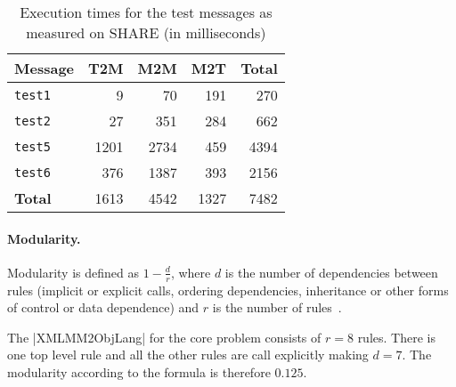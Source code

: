 \begin{table}[h!t]
  \centering
  \begin{tabular}{| l | r | r | r | r |}
    \hline
    \textbf{Message} & \textbf{T2M} & \textbf{M2M} & \textbf{M2T} & \textbf{Total} \\
    \hline
    \texttt{test1}   & 9      & 70     & 191   & 270  \\
    \texttt{test2}   & 27     & 351    & 284   & 662  \\
    \texttt{test5}   & 1201   & 2734   & 459   & 4394 \\
    \texttt{test6}   & 376    & 1387   & 393   & 2156 \\
    \hline
    \textbf{Total}   & 1613   & 4542   & 1327  & 7482 \\
    \hline
  \end{tabular}
  \caption{Execution times for the test \FIXML messages as measured on SHARE (in milliseconds)}
  \label{tab:ExecutionTime}
\end{table}


\paragraph{Modularity.}
%
Modularity is defined as $1 - \frac{d}{r}$, where $d$ is the number of dependencies between rules (implicit or explicit calls, ordering dependencies, inheritance or other forms of control or data dependence) and $r$ is the number of rules~\cite{Lano2014}.

The \Scala|XMLMM2ObjLang| for the core problem consists of $r=8$ rules.
There is one top level rule and all the other rules are call explicitly making $d=7$.
The modularity according to the formula is therefore $0.125$.